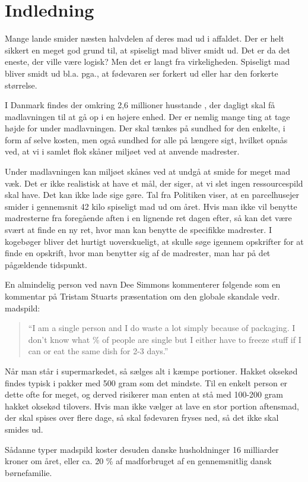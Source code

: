 \section{Indledning}
\label{sec:indledning}

Mange lande smider næsten halvdelen af deres mad ud i affaldet. Der er helt sikkert en meget god grund til, at spiseligt mad bliver smidt ud. Det er da det eneste, der ville være logisk? Men det er langt fra virkeligheden. Spiseligt mad bliver smidt ud bl.a. pga., at fødevaren ser forkert ud eller har den forkerte størrelse.\cite{tedmadspild}

I Danmark findes der omkring 2,6 millioner husstande \cite{husstande}, der dagligt skal få madlavningen til at gå op i en højere enhed. Der er nemlig mange ting at tage højde for under madlavningen. Der skal tænkes på sundhed for den enkelte, i form af selve kosten, men også sundhed for alle på længere sigt, hvilket opnås ved, at vi i samlet flok skåner miljøet ved at anvende madrester.

Under madlavningen kan miljøet skånes ved at undgå at smide for meget mad væk. Det er ikke realistisk at have et mål, der siger, at vi slet ingen ressourcespild skal have. Det kan ikke lade sige gøre. \cite{tedmadspild} Tal fra Politiken viser, at en parcelhusejer smider i gennemsnit 42 kilo spiseligt mad ud om året. \cite{madspildpol} Hvis man ikke vil benytte madresterne fra foregående aften i en lignende ret dagen efter, så kan det være svært at finde en ny ret, hvor man kan benytte de specifikke madrester. I kogebøger bliver det hurtigt uoverskueligt, at skulle søge igennem opskrifter for at finde en opskrift, hvor man benytter sig af de madrester, man har på det pågældende tidspunkt.

En almindelig person ved navn Dee Simmons kommenterer følgende\cite{madspildcomment} som en kommentar på Tristam Stuarts præsentation om den globale skandale vedr. madspild:

\begin{quote}
``I am a single person and I do waste a lot simply because of packaging. I don't know what \% of people are single but I either have to freeze stuff if I can or eat the same dish for 2-3 days.''
\end{quote}

Når man står i supermarkedet, så sælges alt i kæmpe portioner. Hakket oksekød findes typisk i pakker med 500 gram som det mindste. Til en enkelt person er dette ofte for meget, og derved risikerer man enten at stå med 100-200 gram hakket oksekød tilovers. Hvis man ikke vælger at lave en stor portion aftensmad, der skal spises over flere dage, så skal fødevaren fryses ned, så det ikke skal smides ud. 

Sådanne typer madspild koster desuden danske husholdninger 16 milliarder kroner om året, eller ca. 20 \% af madforbruget af en gennemsnitlig dansk børnefamilie. \cite{madspild16}
